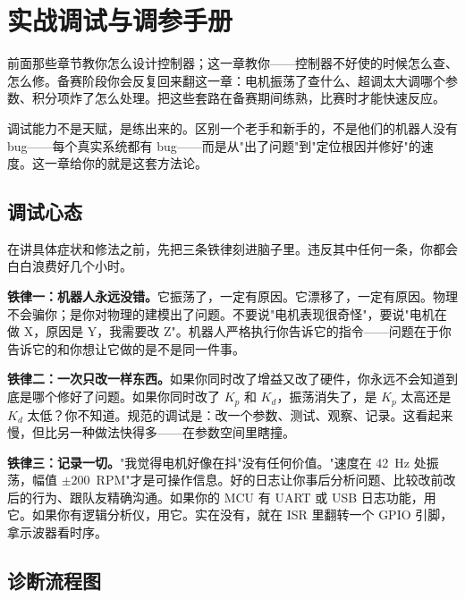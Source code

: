 \section{实战调试与调参手册}

前面那些章节教你怎么设计控制器；这一章教你——控制器不好使的时候怎么查、怎么修。备赛阶段你会反复回来翻这一章：电机振荡了查什么、超调太大调哪个参数、积分项炸了怎么处理。把这些套路在备赛期间练熟，比赛时才能快速反应。

调试能力不是天赋，是练出来的。区别一个老手和新手的，不是他们的机器人没有 bug——每个真实系统都有 bug——而是从"出了问题"到"定位根因并修好"的速度。这一章给你的就是这套方法论。

\subsection{调试心态}

在讲具体症状和修法之前，先把三条铁律刻进脑子里。违反其中任何一条，你都会白白浪费好几个小时。

\textbf{铁律一：机器人永远没错。}它振荡了，一定有原因。它漂移了，一定有原因。物理不会骗你；是你对物理的建模出了问题。不要说"电机表现很奇怪"，要说"电机在做 X，原因是 Y，我需要改 Z"。机器人严格执行你告诉它的指令——问题在于你告诉它的和你想让它做的是不是同一件事。

\textbf{铁律二：一次只改一样东西。}如果你同时改了增益又改了硬件，你永远不会知道到底是哪个修好了问题。如果你同时改了 $K_p$ 和 $K_d$，振荡消失了，是 $K_p$ 太高还是 $K_d$ 太低？你不知道。规范的调试是：改一个参数、测试、观察、记录。这看起来慢，但比另一种做法快得多——在参数空间里瞎撞。

\textbf{铁律三：记录一切。}"我觉得电机好像在抖"没有任何价值。"速度在 42~Hz 处振荡，幅值 $\pm 200$~RPM"才是可操作信息。好的日志让你事后分析问题、比较改前改后的行为、跟队友精确沟通。如果你的 MCU 有 UART 或 USB 日志功能，用它。如果你有逻辑分析仪，用它。实在没有，就在 ISR 里翻转一个 GPIO 引脚，拿示波器看时序。

\subsection{诊断流程图}

